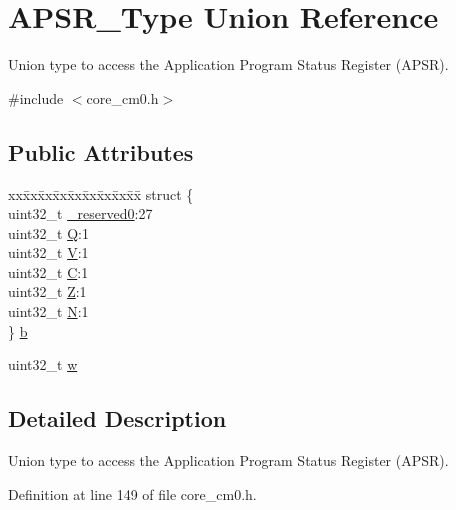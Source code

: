 \hypertarget{union_a_p_s_r___type}{}\section{A\+P\+S\+R\+\_\+\+Type Union Reference}
\label{union_a_p_s_r___type}


Union type to access the Application Program Status Register (A\+P\+SR).  




{\ttfamily \#include $<$core\+\_\+cm0.\+h$>$}

\subsection*{Public Attributes}
\begin{DoxyCompactItemize}
\item 
\begin{tabbing}
xx\=xx\=xx\=xx\=xx\=xx\=xx\=xx\=xx\=\kill
struct \{\\
\>uint32\_t \hyperlink{union_a_p_s_r___type_afbce95646fd514c10aa85ec0a33db728}{\_reserved0}:27\\
\>uint32\_t \hyperlink{union_a_p_s_r___type_a22d10913489d24ab08bd83457daa88de}{Q}:1\\
\>uint32\_t \hyperlink{union_a_p_s_r___type_a8004d224aacb78ca37774c35f9156e7e}{V}:1\\
\>uint32\_t \hyperlink{union_a_p_s_r___type_a86e2c5b891ecef1ab55b1edac0da79a6}{C}:1\\
\>uint32\_t \hyperlink{union_a_p_s_r___type_a3b04d58738b66a28ff13f23d8b0ba7e5}{Z}:1\\
\>uint32\_t \hyperlink{union_a_p_s_r___type_a7e7bbba9b00b0bb3283dc07f1abe37e0}{N}:1\\
\} \hyperlink{union_a_p_s_r___type_a7dbc79a057ded4b11ca5323fc2d5ab14}{b}\\

\end{tabbing}\item 
uint32\+\_\+t \hyperlink{union_a_p_s_r___type_ae4c2ef8c9430d7b7bef5cbfbbaed3a94}{w}
\end{DoxyCompactItemize}


\subsection{Detailed Description}
Union type to access the Application Program Status Register (A\+P\+SR). 

Definition at line 149 of file core\+\_\+cm0.\+h.



